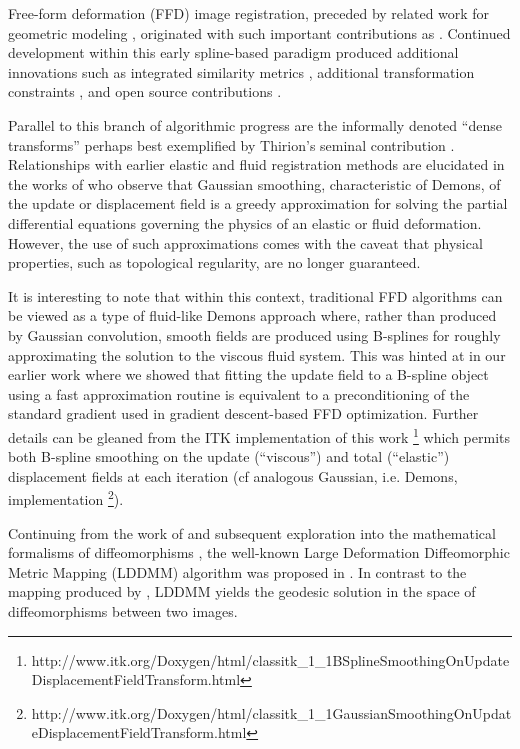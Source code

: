 \documentclass{frontiersSCNS}
\begin{document}
Free-form deformation (FFD) image registration, preceded by related work for
geometric modeling \citep{sederberg1986}, originated with such important
contributions as \cite{szeliski1997,thevenaz1998,rueckert1999}.  Continued 
development within this early spline-based paradigm produced additional innovations
such as integrated similarity metrics \citep[e.g.][]{mattes2003}, additional transformation
constraints \citep[e.g.][]{rohlfing2003}, and open source contributions \citep[e.g.][]{ibanez2005,klein2010,shackleford2010}.

Parallel to this branch of algorithmic progress are the informally 
denoted ``dense transforms''
perhaps best exemplified by Thirion's seminal contribution \citep{thirion1998}.
Relationships with earlier elastic \citep{bajcsy1989,gee1993} and fluid \citep{christensen1996} registration methods are elucidated in 
the works of \cite{bro-nielsen1996,pennec1999} who observe that
Gaussian smoothing, characteristic of Demons, of the update or displacement
field is a greedy approximation for solving the partial differential equations governing
the physics of an elastic or fluid deformation.  However, the use of such 
approximations comes with the caveat that physical properties, such as topological
regularity,
are no longer guaranteed.
 
It is interesting to note that within this context, traditional FFD algorithms
can be viewed as a type of fluid-like Demons approach 
where, rather than produced by Gaussian convolution, smooth fields are produced using B-splines for roughly approximating the solution to the viscous fluid system.  This was hinted at in our earlier work \citep{tustison2009} where we showed that fitting the update field to a B-spline object using a fast approximation routine \citep{tustison2006} is equivalent to a preconditioning of the standard gradient used in gradient descent-based FFD 
optimization.  Further details can be gleaned from the ITK implementation of this work%
\footnote{
http://www.itk.org/Doxygen/html/classitk\_1\_1BSplineSmoothingOnUpdateDisplacementFieldTransform.html
}
which permits both B-spline smoothing on the update (``viscous'') and total (``elastic'') 
displacement fields at each iteration (cf
analogous Gaussian, i.e. Demons, implementation%
\footnote{
http://www.itk.org/Doxygen/html/classitk\_1\_1GaussianSmoothingOnUpdateDisplacementFieldTransform.html
}).

Continuing from the work of \cite{christensen1996} and subsequent exploration into the mathematical formalisms of diffeomorphisms \citep[e.g.][]{dupuis1998}, 
the well-known Large Deformation Diffeomorphic Metric Mapping (LDDMM) algorithm  
was proposed in \cite{Beg2005}.  In contrast to the mapping produced
by \cite{christensen1996}, LDDMM yields the geodesic solution in the space of diffeomorphisms between two images.  
\end{document}
